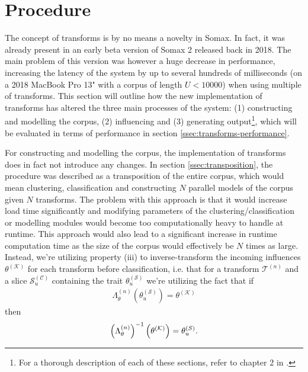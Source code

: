 \section{Procedure}
The concept of transforms is by no means a novelty in Somax. In fact, it was already present in an early beta version of Somax 2 released back in 2018. The main problem of this version was however a huge decrease in performance, increasing the latency of the system by up to several hundreds of milliseconds (on a 2018 MacBook Pro 13" with a corpus of length $U < 10000$) when using multiple of transforms. This section will outline how the new implementation of transforms has altered the three main processes of the system: (1) constructing and modelling the corpus, (2) influencing and (3) generating output\footnote{For a thorough description of each of these sections, refer to chapter 2 in \cite{borg2020dynamic}.}, which will be evaluated in terms of performance in section \ref{ssec:transforms-performance}.

For constructing and modelling the corpus, the implementation of transforms does in fact not introduce any changes. In section \ref{ssec:transposition}, the procedure was described as a transposition of the entire corpus, which would mean clustering, classification and constructing $N$ parallel models of the corpus given $N$ transforms. The problem with this approach is that it would increase load time significantly and modifying parameters of the clustering/classification or modelling modules would become too computationally heavy to handle at runtime. This approach would also lead to a significant increase in runtime computation time as the size of the corpus would effectively be $N$ times as large. Instead, we're utilizing property (iii) to inverse-transform the incoming influences $\theta^{(\mathcal K)}$ for each transform before classification, i.e. that for a transform $\mathcal T^{(n)}$ and a slice $\mathcal S^{(\mathcal C)}_u$ containing the trait $\theta^{(\mathcal S)}_u$ we're utilizing the fact that if \begin{align}
		\Lambda^{(n)}_\theta\left(\theta^{(\mathcal S)}_u\right) = \theta^{(\mathcal K)}
	\end{align} 
	then	
	\begin{align}
		\left(\Lambda^{(n)}_\theta\right)^{-1}\left(\theta^{(\mathcal K)}\right) = \theta^{(\mathcal \mathcal S)}_u.
	\end{align}

